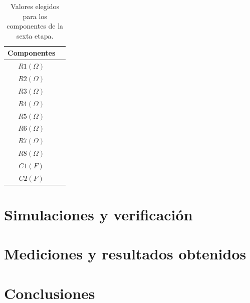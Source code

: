 \begin{table}[H] 
	\centering
	\begin{tabular}{c c}
		Componentes \\
		\hline
		$R1 (\Omega)$ &   \\
		$R2 (\Omega)$ &   \\
		$R3 (\Omega)$ &   \\
		$R4 (\Omega)$ &   \\
		$R5 (\Omega)$ &   \\
		$R6 (\Omega)$ &   \\
		$R7 (\Omega)$ &   \\
		$R8 (\Omega)$ &   \\
		$C1 (F)$ &  \\
		$C2 (F)$ &  \\
		\hline
	\end{tabular}
	\caption{Valores elegidos para los componentes de la sexta etapa.}
	\label{componentes6}
\end{table}

\section{Simulaciones y verificaci\'on}

\section{Mediciones y resultados obtenidos}

\section{Conclusiones}
